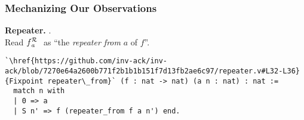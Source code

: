 \begin{frame}[fragile]
\frametitle{Mechanizing Our Observations}
%
%
%




\textbf{Repeater.} %
.
\pause \\Read $\rf{f}{a}$ \ as ``the \emph{repeater from} $a$ of $f$''.



\bigskip
\begin{lstlisting}
`\href{https://github.com/inv-ack/inv-ack/blob/7270e64a2600b771f2b1b1b151f7d13fb2ae6c97/repeater.v#L32-L36}{Fixpoint repeater\_from}` (f : nat -> nat) (a n : nat) : nat :=
  match n with
  | 0 => a
  | S n' => f (repeater_from f a n') end.
\end{lstlisting}


\end{frame}
